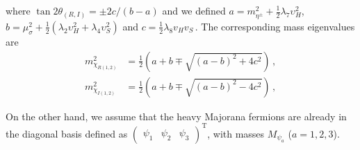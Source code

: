 \documentclass[12pt]{article}
\begin{document}
%
where $\tan2\theta_{(R,I)} = \pm2c/(b-a)$ and we defined $a = m^{2}_{\eta^{\pm}} + \frac{1}{2}\lambda_{7} \upsilon^{2}_{H}$, $b = \mu^{2}_{\sigma}+\frac{1}{2}(\lambda_{2} \upsilon^{2}_{H} + \lambda_{4} \upsilon^{2}_{S})$ and $c = \frac{1}{2}\lambda_8 v_{H} v_{S}$\,. The corresponding mass eigenvalues are
\begin{align*}
    m_{\chi_{R(1,2)}}^{2} &= \frac{1}{2} \left(a + b \mp \sqrt{(a-b)^{2} + 4c^{2}} \right)\,, \\
     m_{\chi_{I(1,2)}}^{2} &= \frac{1}{2} \left(a + b \mp \sqrt{(a-b)^{2} - 4c^{2}} \right)\,,
\end{align*}

On the other hand, we assume that the heavy Majorana fermions are already in the diagonal basis defined as $
\begin{pmatrix}
  \psi_1 &
  \psi_2 &
  \psi_3
\end{pmatrix}^{\operatorname{T}}
$, with masses $M_{\psi_a}$ ($a=1,2,3$).
\end{document}
